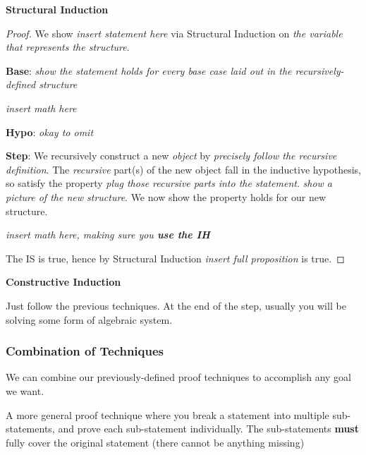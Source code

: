 \documentclass[main.tex]{subfiles}
\begin{document}
\textbf{Structural Induction}

\begin{proof}
	We show \textit{insert statement here} via Structural Induction on \textit{the variable that represents the structure}.
	
	\textbf{Base}: \textit{show the statement holds for every base case laid out in the recursively-defined structure}
	
	\textit{insert math here}
	
	\textbf{Hypo}: \textit{okay to omit}
	
	\textbf{Step}: We recursively construct a new \textit{object} by \textit{precisely follow the recursive definition}. The \textit{recursive} part(s) of the new object fall in the inductive hypothesis, so satisfy the property \textit{plug those recursive parts into the statement}. \textit{show a picture of the new structure}. We now show the property holds for our new structure.
	
	\textit{insert math here, making sure you \textbf{use the IH}}
	
	The IS is true, hence by Structural Induction \textit{insert full proposition} is true.
\end{proof}

\textbf{Constructive Induction}

Just follow the previous techniques. At the end of the step, usually you will be solving some form of algebraic system.

\sectionbreak

\subsubsection{Combination of Techniques}

We can combine our previously-defined proof techniques to accomplish any goal we want.

\begin{defn}
	A more general proof technique where you break a statement into multiple sub-statements, and prove each sub-statement individually. The sub-statements \textbf{must} fully cover the original statement (there cannot be anything missing)
\end{defn}

\end{document}
